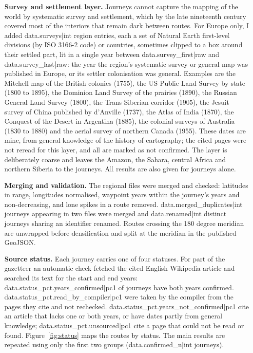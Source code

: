 \documentclass[11pt,a4paper]{article}
\begin{document}
\textbf{Survey and settlement layer.} Journeys cannot capture the mapping of the world by systematic survey and settlement, which by the late nineteenth century covered most of the interiors that remain dark between routes. For Europe only, I added {{data.surveys|int}} region entries, each a set of Natural Earth first-level divisions (by ISO 3166-2 code) or countries, sometimes clipped to a box around their settled part, lit in a single year between {{data.survey_first|raw}} and {{data.survey_last|raw}}: the year the region's systematic survey or general map was published in Europe, or its settler colonisation was general. Examples are the Mitchell map of the British colonies (1755), the US Public Land Survey by state (1800 to 1895), the Dominion Land Survey of the prairies (1890), the Russian General Land Survey (1800), the Trans-Siberian corridor (1905), the Jesuit survey of China published by d'Anville (1737), the Atlas of India (1870), the Conquest of the Desert in Argentina (1885), the colonial surveys of Australia (1830 to 1880) and the aerial survey of northern Canada (1955). These dates are mine, from general knowledge of the history of cartography; the cited pages were not reread for this layer, and all are marked as not confirmed. The layer is deliberately coarse and leaves the Amazon, the Sahara, central Africa and northern Siberia to the journeys. All results are also given for journeys alone.

\textbf{Merging and validation.} The regional files were merged and checked: latitudes in range, longitudes normalised, waypoint years within the journey's years and non-decreasing, and lone spikes in a route removed. {{data.merged_duplicates|int}} journeys appearing in two files were merged and {{data.renamed|int}} distinct journeys sharing an identifier renamed. Routes crossing the 180 degree meridian are unwrapped before densification and split at the meridian in the published GeoJSON.

\textbf{Source status.} Each journey carries one of four statuses. For part of the gazetteer an automatic check fetched the cited English Wikipedia article and searched its text for the start and end years: {{data.status_pct.years_confirmed|pc1}} of journeys have both years confirmed. {{data.status_pct.read_by_compiler|pc1}} were taken by the compiler from the pages they cite and not rechecked. {{data.status_pct.years_not_confirmed|pc1}} cite an article that lacks one or both years, or have dates partly from general knowledge; {{data.status_pct.unsourced|pc1}} cite a page that could not be read or found. Figure~\ref{fig:status} maps the routes by status. The main results are repeated using only the first two groups ({{data.confirmed_n|int}} journeys).
\end{document}
